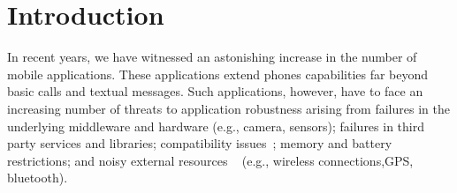 \documentclass[conference]{IEEEtran}
\begin{document}







\section{Introduction}

In recent years, we have witnessed an astonishing increase in the number of
mobile applications. These applications extend phones capabilities 
far beyond basic calls and textual messages. Such applications, however,
have to face an increasing number of threats to application robustness
 arising from failures in the underlying middleware and hardware (e.g., camera, sensors);
failures in third party services and libraries; compatibility issues~\cite{McDon13}; 
 memory and battery restrictions; and noisy external resources ~\cite{Zhang12} 
(e.g., wireless connections,GPS, bluetooth). 
\end{document}
